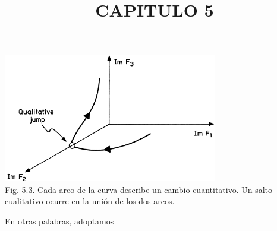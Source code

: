 \begin{justifying}
	\bigskip

	\begin{center}
		\title{\normalsize CAPITULO 5}
	\end{center}

	\smallskip

	\begin{center}
		\includegraphics[width=0.7\textwidth]{img/Figura5-3.png}
		\\ \scriptsize Fig. 5.3. Cada arco de la curva describe un cambio cuantitativo. 
		Un salto cualitativo ocurre en la unión de los dos arcos.
	\end{center}

	\bigskip

	En otras palabras, adoptamos

\end{justifying}
